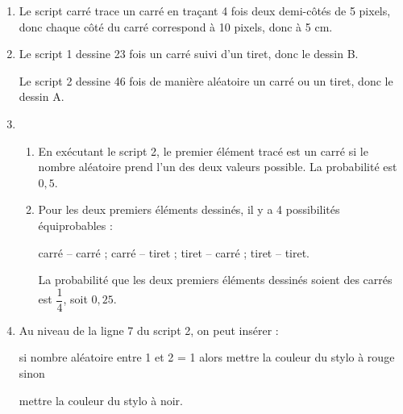 
\medskip

\begin{enumerate}
\item Le script carré trace un carré en traçant 4 fois deux demi-côtés de 5 pixels, donc chaque côté du carré correspond à 10 pixels, donc à 5 cm.
\item Le script 1 dessine 23 fois un carré suivi d'un tiret, donc le dessin B.

Le script 2 dessine 46 fois de manière aléatoire un carré ou un tiret, donc le dessin A.
\item 
	\begin{enumerate}
		\item En exécutant le script 2, le premier élément tracé est un carré si le nombre aléatoire prend l'un des deux valeurs possible. La probabilité est $0,5$. 
		\item Pour les deux premiers éléments dessinés, il y a 4 possibilités équiprobables :
		
carré – carré ; carré – tiret ; tiret – carré ; tiret – tiret.

La probabilité que les deux premiers éléments dessinés soient des carrés est $\dfrac{1}{4}$, soit $0,25$.
	\end{enumerate} 
\item Au niveau de la ligne 7 du script 2, on peut insérer :

si nombre aléatoire entre 1 et 2 = 1 alors mettre la couleur du stylo à rouge
sinon 

mettre la couleur du stylo à noir.
\end{enumerate}
\bigskip

